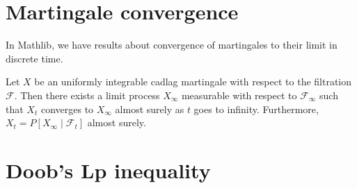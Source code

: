 



























\section{Martingale convergence}



In Mathlib, we have results about convergence of martingales to their limit in discrete time.


\begin{theorem}\label{thm:tendsto_limitProcess_of_cadlag}
Let $X$ be an uniformly integrable cadlag martingale with respect to the filtration $\mathcal{F}$.
Then there exists a limit process $X_\infty$ measurable with respect to $\mathcal{F}_\infty$ such that $X_t$ converges to $X_\infty$ almost surely as $t$ goes to infinity.
Furthermore, $X_t = P[X_\infty \mid \mathcal{F}_t]$ almost surely.
\end{theorem}







\section{Doob's Lp inequality}

